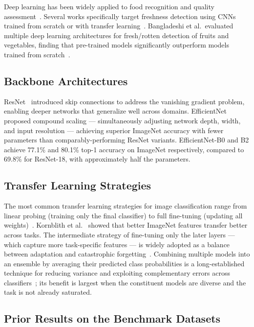 \documentclass[conference]{IEEEtran}
\begin{document}
Deep learning has been widely applied to food recognition and quality
assessment~\cite{automatic2023classification}.
Several works specifically target freshness detection using CNNs trained
from scratch or with transfer
learning~\cite{fresh2023rotten,iqbal2025canned}.
Bangladeshi et al.\ evaluated multiple deep learning architectures for
fresh/rotten detection of fruits and vegetables, finding that pre-trained
models significantly outperform models trained from
scratch~\cite{bangladeshi2022fresh}.

\subsection{Backbone Architectures}

ResNet~\cite{he2016resnet} introduced skip connections to address the
vanishing gradient problem, enabling deeper networks that generalize well
across domains.
EfficientNet~\cite{tan2019efficientnet} proposed compound scaling ---
simultaneously adjusting network depth, width, and input resolution ---
achieving superior ImageNet accuracy with fewer parameters than
comparably-performing ResNet variants.
EfficientNet-B0 and B2 achieve 77.1\% and 80.1\% top-1 accuracy on
ImageNet respectively, compared to 69.8\% for ResNet-18, with
approximately half the parameters.

\subsection{Transfer Learning Strategies}

The most common transfer learning strategies for image classification
range from linear probing (training only the final classifier)
to full fine-tuning (updating all weights)~\cite{pan2010transfer}.
Kornblith et al.~\cite{kornblith2019better} showed that better ImageNet
features transfer better across tasks.
The intermediate strategy of fine-tuning only the later layers ---
which capture more task-specific features --- is widely adopted as a
balance between adaptation and catastrophic
forgetting~\cite{kirkpatrick2017catastrophic}.
Combining multiple models into an ensemble by averaging their predicted
class probabilities is a long-established technique for reducing variance
and exploiting complementary errors across
classifiers~\cite{dietterich2000ensemble}; its benefit is largest when the
constituent models are diverse and the task is not already saturated.

\subsection{Prior Results on the Benchmark Datasets}
\end{document}
